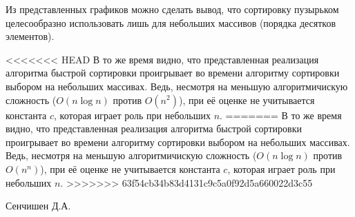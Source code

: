 \documentclass[
	12pt,
	paper=A4,
	oneside,
	draft
]{scrreprt}
\begin{document}
Из представленных графиков можно сделать вывод, что сортировку пузырьком целесообразно использовать лишь для небольших массивов (порядка десятков элементов). 

<<<<<<< HEAD
В то же время видно, что представленная реализация алгоритма быстрой сортировки проигрывает во времени алгоритму сортировки выбором на небольших массивах. Ведь, несмотря на меньшую алгоритмичискую сложность ($O(n\log n)$ против $O(n^2)$), при её оценке не учитывается константа $c$, которая играет роль при небольших $n$.
=======
В то же время видно, что представленная реализация алгоритма быстрой сортировки проигрывает во времени алгоритму сортировки выбором на небольших массивах. Ведь, несмотря на меньшую алгоритмичискую сложность ($O(n\log n)$ против $O(n^n)$), при её оценке не учитывается константа $c$, которая играет роль при небольших $n$.
>>>>>>> 63f54cb34b83d4131c9c5a0f92d5a660022d3c55
\vfill
\begin{flushright}
Сенчишен Д.А.
\end{flushright}
\end{document}
